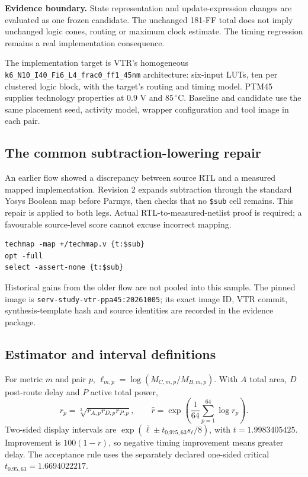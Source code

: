 \begin{claimbox}\textbf{Evidence boundary.} State representation and update-expression changes are evaluated as one frozen candidate. The unchanged 181-FF total does not imply unchanged logic cones, routing or maximum clock estimate. The timing regression remains a real implementation consequence.\end{claimbox}

The implementation target is VTR's homogeneous \texttt{k6\_N10\_I40\_Fi6\_L4\_frac0\_ff1\_45nm} architecture: six-input LUTs, ten per clustered logic block, with the target's routing and timing model. PTM45 supplies technology properties at 0.9 V and $85\,^{\circ}$C. Baseline and candidate use the same placement seed, activity model, wrapper configuration and tool image in each pair.

\subsection{The common subtraction-lowering repair}
An earlier flow showed a discrepancy between source RTL and a measured mapped implementation. Revision 2 expands subtraction through the standard Yosys Boolean map before Parmys, then checks that no \texttt{\$sub} cell remains. This repair is applied to both legs. Actual RTL-to-measured-netlist proof is required; a favourable source-level score cannot excuse incorrect mapping.
\begin{lstlisting}[basicstyle=\ttfamily\scriptsize]
techmap -map +/techmap.v {t:$sub}
opt -full
select -assert-none {t:$sub}
\end{lstlisting}
Historical gains from the older flow are not pooled into this sample. The pinned image is \nolinkurl{serv-study-vtr-ppa45:20261005}; its exact image ID, VTR commit, synthesis-template hash and source identities are recorded in the evidence package.

\subsection{Estimator and interval definitions}
For metric $m$ and pair $p$, $\ell_{m,p}=\log(M_{C,m,p}/M_{B,m,p})$. With $A$ total area, $D$ post-route delay and $P$ active total power,
\[
r_p=\sqrt[3]{r_{A,p}r_{D,p}r_{P,p}},\qquad
\widehat r=\exp\!\left(\frac{1}{64}\sum_{p=1}^{64}\log r_p\right).
\]
Two-sided display intervals are $\exp(\bar\ell\pm t_{0.975,63}s_\ell/8)$, with $t=1.9983405425$. Improvement is $100(1-r)$, so negative timing improvement means greater delay. The acceptance rule uses the separately declared one-sided critical $t_{0.95,63}=1.6694022217$.

